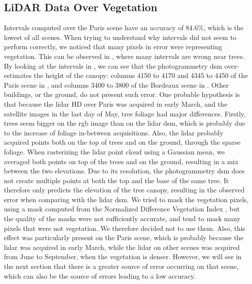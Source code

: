 \subsection{LiDAR Data Over Vegetation}\label{eq:lidar_vegetation}
Intervals computed over the Paris scene have an accuracy of $84.6\%$, which is the lowest of all scenes. When trying to understand why intervals did not seem to perform correctly, we noticed that many pixels in error were representing vegetation. This can be observed in , where many intervals are wrong near trees. By looking at the intervals in , we can see that the photogrammetry \acrshort{dsm} over-estimates the height of the canopy: columns 4150 to 4170 and 4345 to 4450 of the Paris scene in , and columns 3400 to 3800 of the Bordeaux scene in . Other buildings, or the ground, do not present such error. One probable hypothesis is that because the \acrshort{lidar} HD over Paris was acquired in early March, and the satellite images in the last day of May, tree foliage had major differences. Firstly, trees seem bigger on the \acrshort{rgb} image than on the \acrshort{lidar} \acrshort{dsm}, which is probably due to the increase of foliage in-between acquisitions. Also, the \acrshort{lidar} probably acquired points both on the top of trees and on the ground, through the sparse foliage. When rasterizing the \acrshort{lidar} point cloud using a Gaussian mean, we averaged both points on top of the trees and on the ground, resulting in a mix between the two elevations. Due to its resolution, the photogrammetry \acrshort{dsm} does not create multiple points at both the top and the base of the same tree. It therefore only predicts the elevation of the tree canopy, resulting in the observed error when comparing with the \acrshort{lidar} \acrshort{dsm}. We tried to mask the vegetation pixels, using a mask computed from the Normalized Difference Vegetation Index \cite{gao_ndwinormalized_1996}, but the quality of the masks were not sufficiently accurate, and tend to mask many pixels that were not vegetation. We therefore decided not to use them. Also, this effect was particularly present on the Paris scene, which is probably because the \acrshort{lidar} was acquired in early March, while the \acrshort{lidar} on other scenes was acquired from June to September, when the vegetation is denser. However, we will see in the next section that there is a greater source of error occurring on that scene, which can also be the source of errors leading to a low accuracy.

